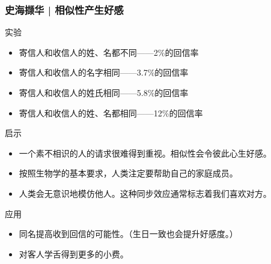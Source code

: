 \begin{frame}
  \frametitle{史海撷华 | 相似性产生好感}
  \begin{block}{实验}
    \begin{itemize}
      \item 寄信人和收信人的姓、名都不同——2\%的回信率
      \item 寄信人和收信人的名字相同——3.7\%的回信率
      \item 寄信人和收信人的姓氏相同——5.8\%的回信率
      \item 寄信人和收信人的姓、名都相同——12\%的回信率
    \end{itemize}
  \end{block}
  \vspace{-0.5em}
  \pause
  \begin{block}{启示}
    \begin{itemize}
      \item 一个素不相识的人的请求很难得到重视。相似性会令彼此心生好感。
      \item 按照生物学的基本要求，人类注定要帮助自己的家庭成员。
      \item 人类会无意识地模仿他人。这种同步效应通常标志着我们喜欢对方。
    \end{itemize}
  \end{block}
  \vspace{-0.5em}
  \pause
  \begin{block}{应用}
    \begin{itemize}
      \item 同名提高收到回信的可能性。（生日一致也会提升好感度。）
      \item 对客人学舌得到更多的小费。
    \end{itemize}
  \end{block}
\end{frame}

